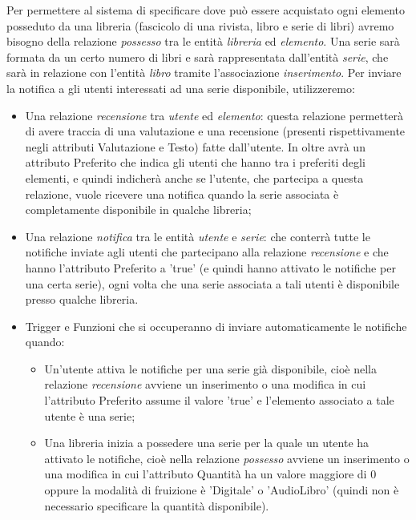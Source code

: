 \documentclass{article}
\begin{document}
Per permettere al sistema di specificare dove può essere acquistato ogni elemento posseduto da una libreria (fascicolo di una rivista, libro e serie di libri) avremo bisogno della relazione \textit{possesso} tra le entità \textit{libreria} ed \textit{elemento}.
Una serie sarà formata da un certo numero di libri e sarà rappresentata dall'entità \textit{serie}, che sarà in relazione con l'entità \textit{libro} tramite l'associazione \textit{inserimento}.
Per inviare la notifica a gli utenti interessati ad una serie disponibile, utilizzeremo:
\begin{itemize}
    \item Una relazione \textit{recensione} tra \textit{utente} ed \textit{elemento}: questa relazione permetterà di avere traccia di una valutazione e una recensione (presenti rispettivamente negli attributi Valutazione e Testo) fatte dall'utente. In oltre avrà un attributo Preferito che indica gli utenti che hanno tra i preferiti degli elementi, e quindi indicherà anche se l'utente, che partecipa a questa relazione, vuole ricevere una notifica quando la serie associata è completamente disponibile in qualche libreria;
    \item Una relazione \textit{notifica} tra le entità \textit{utente} e \textit{serie}: che conterrà tutte le notifiche inviate agli utenti che partecipano alla relazione \textit{recensione} e che hanno l'attributo Preferito a 'true' (e quindi hanno attivato le notifiche per una certa serie), ogni volta che una serie associata a tali utenti è disponibile presso qualche libreria.
    \item Trigger e Funzioni che si occuperanno di inviare automaticamente le notifiche quando:
    \begin{itemize}
        \item Un'utente attiva le notifiche per una serie già disponibile, cioè nella relazione \textit{recensione} avviene un inserimento o una modifica in cui l'attributo Preferito assume il valore 'true' e l'elemento associato a tale utente è una serie;
        \item Una libreria inizia a possedere una serie per la quale un utente ha attivato le notifiche, cioè nella relazione \textit{possesso} avviene un inserimento o una modifica in cui l'attributo Quantità ha un valore maggiore di 0 oppure la modalità di fruizione è 'Digitale' o 'AudioLibro' (quindi non è necessario specificare la quantità disponibile).
    \end{itemize} 
\end{itemize}
\end{document}
